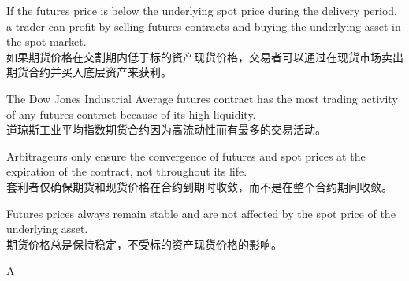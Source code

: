 \documentclass{article}
\begin{document}
    \begin{choices}
        \item If the futures price is below the underlying spot price during the delivery period, a trader can profit by selling futures contracts and buying the underlying asset in the spot market.\\
        如果期货价格在交割期内低于标的资产现货价格，交易者可以通过在现货市场卖出期货合约并买入底层资产来获利。
        \item The Dow Jones Industrial Average futures contract has the most trading activity of any futures contract because of its high liquidity.\\
        道琼斯工业平均指数期货合约因为高流动性而有最多的交易活动。
        \item Arbitrageurs only ensure the convergence of futures and spot prices at the expiration of the contract, not throughout its life.\\
        套利者仅确保期货和现货价格在合约到期时收敛，而不是在整个合约期间收敛。
        \item Futures prices always remain stable and are not affected by the spot price of the underlying asset.\\
        期货价格总是保持稳定，不受标的资产现货价格的影响。
    \end{choices}
    
    \begin{correctanswer}
        A
    \end{correctanswer}
    
\end{document}
